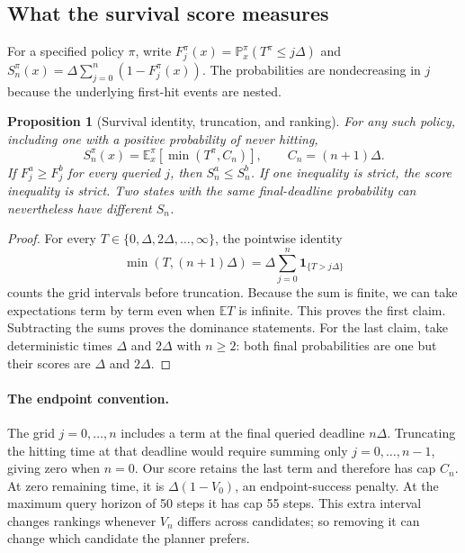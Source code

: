 \documentclass{article}
\newcommand{\ind}{\mathbf{1}}
\newcommand{\EE}{\mathbb E}
\newcommand{\PP}{\mathbb P}
\newtheorem{proposition}[theorem]{Proposition}
\theoremstyle{definition}
\theoremstyle{remark}
\begin{document}
\subsection{What the survival score measures}
\label{app:survival}
For a specified policy $\pi$, write
$F_j^\pi(x)=\PP_x^\pi(T^\pi\le j\Delta)$ and
$S_n^\pi(x)=\Delta\sum_{j=0}^{n}(1-F_j^\pi(x))$.
The probabilities are nondecreasing in $j$ because the underlying first-hit events
are nested.

\begin{proposition}[Survival identity, truncation, and ranking]
\label{prop:survival}
For any such policy, including one with a positive probability of never hitting,
\begin{equation}
 S_n^\pi(x)=\EE_x^\pi[\min(T^\pi,C_n)],\qquad C_n=(n+1)\Delta.
 \label{eq:tail-identity}
\end{equation}
If $F_j^a\ge F_j^b$ for every queried $j$, then $S_n^a\le S_n^b$.
If one inequality is strict, the score inequality is strict.
Two states with the same final-deadline probability can nevertheless have different
$S_n$.
\end{proposition}
\begin{proof}
For every $T\in\{0,\Delta,2\Delta,\ldots,\infty\}$, the pointwise identity
\[
 \min(T,(n+1)\Delta)=\Delta\sum_{j=0}^{n}\ind_{\{T>j\Delta\}}
\]
counts the grid intervals before truncation. Because the sum is finite, we can take
expectations term by term even when $\EE T$ is infinite. This proves the
first claim. Subtracting the sums proves the dominance statements.
For the last claim, take deterministic times $\Delta$ and $2\Delta$ with $n\ge2$:
both final probabilities are one but their scores are $\Delta$ and $2\Delta$.
\end{proof}

\paragraph{The endpoint convention.}
The grid $j=0,\ldots,n$ includes a term at the final queried deadline $n\Delta$.
Truncating the hitting time at that deadline would require summing only
$j=0,\ldots,n-1$, giving zero when $n=0$.
Our score retains the last term and therefore has cap $C_n$.
At zero remaining time, it is $\Delta(1-V_0)$, an endpoint-success penalty.
At the maximum query horizon of 50 steps it has cap 55 steps.
This extra interval changes rankings whenever $V_n$ differs across candidates;
so removing it can change which candidate the planner prefers.
\end{document}

